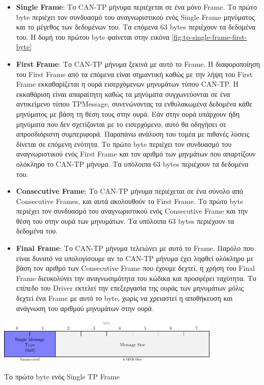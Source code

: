 \documentclass[a4paper,nobib,justified]{tufte-book}
\begin{document}
\begin{itemize}
	\item \textbf{Single Frame}: Το CAN-TP μήνυμα περιέχεται σε ένα μόνο Frame. Το πρώτο byte περιέχει τον συνδυασμό του αναγνωριστικού ενός Single Frame μηνύματος και το μέγεθος των δεδομένων του. Τα επόμενα 63 bytes περιέχουν τα δεδομένα του. Η δομή του πρώτου byte φαίνεται στην εικόνα \ref{fig:tp-single-frame-first-byte}
	\item \textbf{First Frame}: Το CAN-TP μήνυμα ξεκινά με αυτό το Frame. Η διαφοροποίηση του First Frame από τα επόμενα είναι σημαντική καθώς με την λήψη του First Frame εκκαθαρίζεται η ουρά εισερχόμενων μηνυμάτων τύπου CAN-TP. Η εκκαθάριση είναι απαραίτητη καθώς τα μηνύματα συγχωνεύονται σε ένα αντικείμενο τύπου TPMessage, συνενώνοντας τα ενθυλακωμένα δεδομένα κάθε μηνύματος με βάση τη θέση τους στην ουρά. Εάν στην ουρά υπάρχουν ήδη μηνύματα που δεν σχετίζονται με το εισερχόμενο, αυτό θα οδηγήσει σε απροσδιόριστη συμπεριφορά. Παραπάνω ανάλυση του τομέα με πιθανές λύσεις δίνεται σε επόμενη ενότητα. Το πρώτο byte περιέχει τον συνδυασμό του αναγνωριστικού ενός First Frame και τον αριθμό των μηνμάτων που απαρτίζουν ολόκληρο το CAN-TP μήνυμα. Τα υπόλοιπα 63 bytes περιέχουν τα δεδομένα του.
	\item \textbf{Consecutive Frame}: Το CAN-TP μήνυμα περιέχεται σε ένα σύνολο από Consecutive Frames, και αυτά ακολουθούν το First Frame. Το πρώτο byte περιέχει τον συνδυασμό του αναγνωριστικού ενός Consecutive Frame και την θέση του στην ουρά των μηνυμάτων. Τα υπόλοιπα 63 bytes περιέχουν τα δεδομένα του.
	\item \textbf{Final Frame}: Το CAN-TP μήνυμα τελειώνει με αυτό το Frame. Παρόλο που είναι δυνατό να υπολογίσουμε αν το CAN-TP μήνυμα έχει ληφθεί ολόκληρο με βάση τον αριθμό των Consecutive Frame που έχουμε δεχτεί, η χρήση του Final Frame διευκολύνει την αναγνωσιμότητα του κώδικα και προσφέρει ταχύτητα. Το επίπεδο του Driver εκτελεί την επεξεργασία της ουράς των μηνυμάτων μόλις δεχτεί ένα Frame με αυτό το byte, χωρίς να χρειαστεί η αποθήκευση και ανάγνωση του αριθμού μηνυμάτων στην ουρά. 
\end{itemize}

\begin{marginfigure}
	\includegraphics[width=0.8\textwidth]{media/diagrams/tp-messages/single-message-first-byte.pdf}
	\label{fig:tp-single-frame-first-byte}
	\caption{Το πρώτο byte ενός Single TP Frame}
\end{marginfigure}
\end{document}
